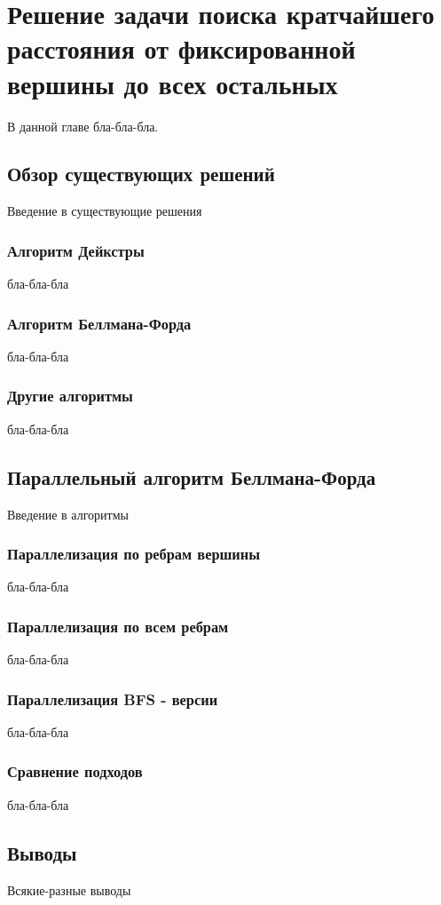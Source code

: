 \chapter{Решение задачи поиска кратчайшего расстояния от фиксированной вершины до всех остальных}
\label{chapSVD}

В данной главе бла-бла-бла.

\FloatBarrier
\section{Обзор существующих решений}

Введение в существующие решения

\FloatBarrier
\subsection{Алгоритм Дейкстры}

бла-бла-бла


\FloatBarrier
\subsection{Алгоритм Беллмана-Форда}

бла-бла-бла

\FloatBarrier
\subsection{Другие алгоритмы}

бла-бла-бла


\FloatBarrier
\section{Параллельный алгоритм Беллмана-Форда}

Введение в алгоритмы

\FloatBarrier
\subsection{Параллелизация по ребрам вершины}
бла-бла-бла

\FloatBarrier
\subsection{Параллелизация по всем ребрам}
бла-бла-бла


\FloatBarrier
\subsection{Параллелизация BFS - версии}
бла-бла-бла

\FloatBarrier
\subsection{Сравнение подходов}
бла-бла-бла

\FloatBarrier
\section{Выводы}

Всякие-разные выводы

\FloatBarrier
